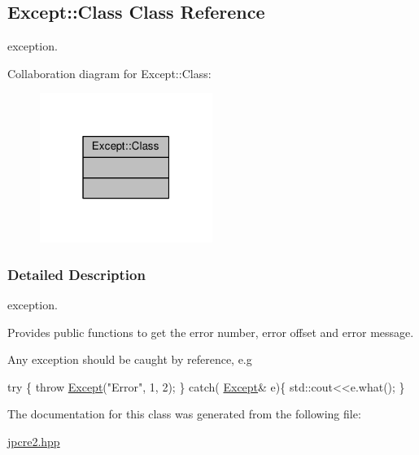 \hypertarget{classExcept_1_1Class}{}\subsection{Except\+:\+:Class Class Reference}
\label{classExcept_1_1Class}


exception.  




Collaboration diagram for Except\+:\+:Class\+:
\nopagebreak
\begin{figure}[H]
\begin{center}
\leavevmode
\includegraphics[width=159pt]{classExcept_1_1Class__coll__graph}
\end{center}
\end{figure}


\subsubsection{Detailed Description}
exception. 

Provides public functions to get the error number, error offset and error message.

Any exception should be caught by reference, e.\+g 
\begin{DoxyCode}
\textcolor{keywordflow}{try} \{
    \textcolor{keywordflow}{throw} \hyperlink{namespaceExcept}{Except}(\textcolor{stringliteral}{"Error"}, 1, 2);
\}
\textcolor{keywordflow}{catch}( \hyperlink{namespaceExcept}{Except}& e)\{
    std::cout<<e.what();
\}
\end{DoxyCode}
 

The documentation for this class was generated from the following file\+:\begin{DoxyCompactItemize}
\item 
\hyperlink{jpcre2_8hpp}{jpcre2.\+hpp}\end{DoxyCompactItemize}

